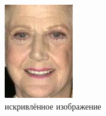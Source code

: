 \begin{figure}[t]
\begin{subfigure}[t]{0.25\textwidth}
		\includegraphics[width=\textwidth]{gandhi/from_57_2.png}
		\caption{искривлённое изображение}
	\end{subfigure}
	\begin{subfigure}[t]{0.25\textwidth}

\end{subfigure}
\end{figure}
